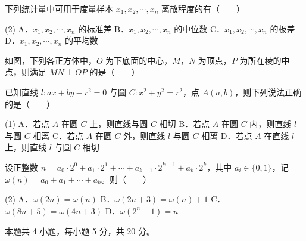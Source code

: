 \begin{question}
下列统计量中可用于度量样本 $x_1,x_2,\cdots,x_n$ 离散程度的有\mbox{（　　）}

\begin{gkopts}(2)
\task A．$x_1,x_2,\cdots,x_n$ 的标准差
\task B．$x_1,x_2,\cdots,x_n$ 的中位数
\task C．$x_1,x_2,\cdots,x_n$ 的极差
\task D．$x_1,x_2,\cdots,x_n$ 的平均数
\end{gkopts}

\Needspace{0.4\textheight}
\end{question}
\begin{question}
如图，下列各正方体中，$O$ 为下底面的中心，$M$，$N$ 为顶点，$P$ 为所在棱的中点，则满足 $MN\perp OP$ 的是\mbox{（　　）}
\nopagebreak[4]
\begin{center}\end{center}
\nopagebreak[4]
\end{question}
\begin{question}
已知直线 $l:ax+by-r^{2}=0$ 与圆 $C:x^{2}+y^{2}=r^{2}$，点 $A(a,b)$，则下列说法正确的是\mbox{（　　）}

\begin{gkopts}(1)
\task A．若点 $A$ 在圆 $C$ 上，则直线与圆 $C$ 相切
\task B．若点 $A$ 在圆 $C$ 内，则直线 $l$ 与圆 $C$ 相离
\task C．若点 $A$ 在圆 $C$ 外，则直线 $l$ 与圆 $C$ 相离
\task D．若点 $A$ 在直线 $l$ 上，则直线 $l$ 与圆 $C$ 相切
\end{gkopts}

\end{question}
\begin{question}
设正整数 $n=a_0\cdot2^{0}+a_1\cdot2^{1}+\cdots+a_{k-1}\cdot2^{k-1}+a_k\cdot2^{k}$，其中 $a_i\in\{0,1\}$，记 $\omega(n)=a_0+a_1+\cdots+a_k$。则\mbox{（　　）}

\begin{gkopts}(2)
\task A．$\omega(2n)=\omega(n)$
\task B．$\omega(2n+3)=\omega(n)+1$
\task C．$\omega(8n+5)=\omega(4n+3)$
\task D．$\omega\left(2^{n}-1\right)=n$
\end{gkopts}

\par\medskip

\end{question}

\begin{gktip}
本题共 4 小题，每小题 5 分，共 20 分。
\end{gktip}

